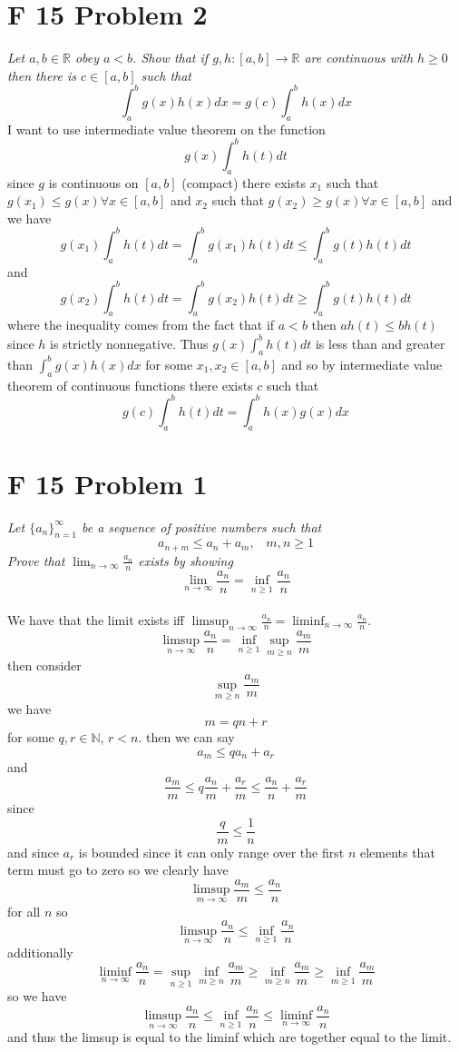 \documentclass{article}
\begin{document}
\section{F 15 Problem 2}
\emph{
    Let $a,b \in \mathbb{R}$ obey $a < b$. Show that if  $g, h: [a,b] \rightarrow \mathbb{R}$ are 
    continuous with $h \ge 0$ then there is  $c \in [a,b]$ such that
     \[
    \int_{a}^{b}g(x)h(x)dx = g(c)\int_{a}^{b}h(x)dx
    \] 
}
    I want to use intermediate value theorem on the function
    \[
    g(x)\int_{a}^{b}h(t)dt
    \] 
    since $g$ is continuous on $[a,b]$ (compact) there exists  $x_1$ such that $g(x_1) \le g(x) \forall x \in [a,b]$ 
    and $x_2$ such that $g(x_2) \ge g(x) \forall x \in [a,b]$ and we have
    \[
    g(x_1)\int_{a}^{b}h(t)dt = \int_{a}^{b}g(x_1)h(t)dt \le \int_{a}^{b}g(t)h(t)dt
    \] 
    and
    \[
    g(x_2)\int_{a}^{b}h(t)dt = \int_{a}^{b}g(x_2)h(t)dt \ge \int_{a}^{b}g(t)h(t)dt
    \] 
    where the inequality comes from the fact that if $a < b$ then  $ah(t) \le bh(t)$ since  $h$ is strictly nonnegative.
    Thus $g(x)\int_{a}^{b}h(t)dt$ is less than and greater than $\int_{a}^{b}g(x)h(x)dx$ for some $x_1,x_2 \in [a,b]$ and so by intermediate value theorem
    of continuous functions there exists $c$ such that
    \[
    g(c)\int_{a}^{b}h(t)dt = \int_{a}^{b}h(x)g(x)dx
    \] 


\section{F 15 Problem 1}
\emph{
    Let $\{a_n\}_{n=1}^{\infty}$ be a sequence of positive numbers such that
    \[
        a_{n+m} \le a_n + a_m, \;\;\; m,n \ge 1
    \] 
    Prove that $\lim_{n\to \infty} \frac{a_n}{n}$ exists by showing
    \[
        \lim_{n\to \infty} \frac{a_n}{n} = \inf_{n \ge 1}\frac{a_n}{n}
    \] 
}
\\
We have that the limit exists iff $\limsup_{n\to \infty}\frac{a_n}{n} = \liminf_{n\to \infty}\frac{a_n}{n}$.
\[
    \limsup_{n\to \infty}\frac{a_n}{n} = \inf_{n \ge 1}\sup_{m \ge n}\frac{a_m}{m}
\] 
then consider
\[
    \sup_{m \ge n} \frac{a_m}{m}
\] 
we have
\[
m = qn + r
\] 
for some $q,r \in \mathbb{N}$, $r < n$. then we can say
\[
a_m \le q a_n + a_r
\] 
and
\[
    \frac{a_m}{m} \le q \frac{a_n}{m} + \frac{a_r}{m} \le \frac{a_n}{n} + \frac{a_r}{m}
\] 
since
\[
\frac{q}{m} \le \frac{1}{n}
\] 
and since $a_r$ is bounded since it can only range over the first $n$ elements that term must go to zero 
so we clearly have
\[
\limsup_{m\to \infty}\frac{a_m}{m} \le \frac{a_n}{n}
\] 
for all $n$ so 
\[
    \limsup_{n\to \infty}\frac{a_n}{n} \le \inf_{n \ge 1} \frac{a_n}{n}
\] 
additionally
\[
    \liminf_{n\to \infty}\frac{a_n}{n} = \sup_{n\ge 1}\inf_{m \ge n} \frac{a_m}{m} \ge \inf_{m \ge n}\frac{a_m}{m} \ge \inf_{m \ge 1} \frac{a_m}{m}
\] 
so we have
\[
    \limsup_{n\to \infty}\frac{a_n}{n} \le \inf_{n \ge 1} \frac{a_n}{n} \le \liminf_{n\to \infty} \frac{a_n}{n}
\] 
and thus the limsup is equal to the liminf which are together equal to the limit.
\end{document}
